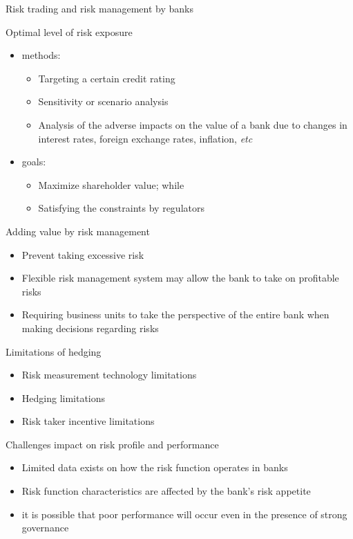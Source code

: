 \begin{frame}[allowframebreaks]{Risk trading and risk management by banks}

\begin{block}{Optimal level of risk exposure}
	\begin{itemize}
		\item methods:
		\begin{itemize}
			\item Targeting a certain credit rating
			\item Sensitivity or scenario analysis
			\item Analysis of the adverse impacts on the value of
			a bank due to changes in interest rates, foreign exchange rates, inflation, \textit{etc}
		\end{itemize}
		\item goals:
		\begin{itemize}
			\item Maximize shareholder value; while
			\item Satisfying the constraints by regulators
		\end{itemize}
	\end{itemize}
\end{block}

\begin{block}{Adding value by risk management}
	\begin{itemize}
		\item Prevent taking excessive risk
		\item Flexible risk management system may allow the bank to take on profitable risks
		\item Requiring business units to take
		the perspective of the entire bank when making decisions regarding risks
	\end{itemize}
\end{block}

\begin{block}{Limitations of hedging}
	\begin{itemize}
		\item Risk measurement technology limitations
		\item Hedging limitations
		\item Risk taker incentive limitations
	\end{itemize}
\end{block}

\begin{block}{Challenges impact on risk profile and performance}
	\begin{itemize}
		\item Limited data exists on how the risk function operates in banks
		\item Risk function characteristics are affected by the
		bank's risk appetite
		\item it is possible that poor performance will occur even in the presence of strong governance
	\end{itemize}
\end{block}

\end{frame}

